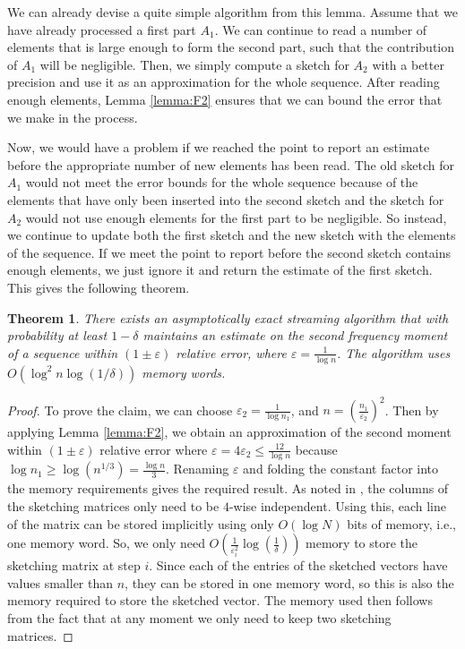 \documentclass[a4paper,11pt,oneside,english,onecolumn]{article}
\newtheorem{theorem}{Theorem}
\theoremstyle{definition}
\newcommand{\bigO}[1]{\ensuremath{O\left( #1 \right)}}
\newcommand{\eps}{\ensuremath{\varepsilon}}
\begin{document}
We can already devise a quite simple algorithm from this lemma. Assume that we have already processed a first part $A_1$. We can continue to read a number of elements that is large enough to form the second part, such that the contribution of $A_1$ will be negligible. Then, we simply compute a sketch for $A_2$ with a better precision and use it as an approximation for the whole sequence. After reading enough elements, Lemma \ref{lemma:F2} ensures that we can bound the error that we make in the process.

Now, we would have a problem if we reached the point to report an estimate before the appropriate number of new elements has been read. The old sketch for $A_1$ would not meet the error bounds for the whole sequence because of the elements that have only been inserted into the second sketch and the sketch for $A_2$ would not use enough elements for the first part to be negligible. So instead, we continue to update both the first sketch and the new sketch with the elements of the sequence. If we meet the point to report before the second sketch contains enough elements, we just ignore it and return the estimate of the first sketch. This gives the following theorem.

\begin{theorem}
\label{th:F2}
There exists an asymptotically exact streaming algorithm that with probability at least $1-\delta$ maintains an estimate on the second frequency moment of a sequence within $(1 \pm \eps)$ relative error, where $\eps = \frac{1}{\log n}$. The algorithm uses $\bigO {\log^2 n \log(1/\delta)}$ memory words.
\end{theorem}

\begin{proof}
To prove the claim, we can choose $\eps_2 = \frac{1}{\log n_1}$, and $n = (\frac{n_1}{\eps_2})^2$. Then by applying Lemma \ref{lemma:F2}, we obtain an approximation of the second moment within $(1\pm\eps)$ relative error where $\eps = 4 \eps_2 \leq \frac{12}{\log n}$ because $\log n_1 \geq \log(n^{1/3}) = \frac{\log n}{3}$. Renaming $\eps$ and folding the constant factor into the memory requirements gives the required result. 
As noted in \cite{ApproxFreqMom}, the columns of the sketching matrices only need to be $4$-wise independent. Using this, each line of the matrix can be stored implicitly using only $O(\log N)$ bits of memory, i.e., one memory word. So, we only need $O(\frac{1}{\eps_i^2}\log(\frac{1}{\delta}))$ memory to store the sketching matrix at step $i$. Since each of the entries of the sketched vectors have values smaller than $n$, they can be stored in one memory word, so this is also the memory required to store the sketched vector. The memory used then follows from the fact that at any moment we only need to keep two sketching matrices.
\end{proof}
\end{document}
